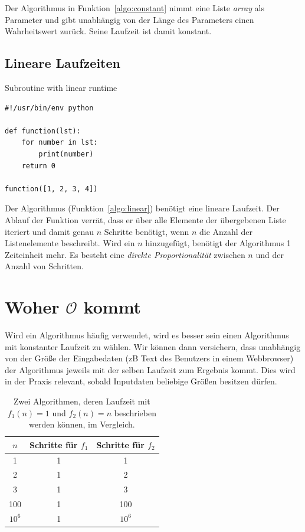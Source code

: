 Der Algorithmus in Funktion~\ref{algo:constant} nimmt eine Liste \textit{array} als Parameter und gibt unabhängig von der Länge des Parameters einen Wahrheitswert zurück. Seine Laufzeit ist damit konstant.

\subsection{Lineare Laufzeiten}
%
\begin{algorithm}[p]
\caption{Subroutine with linear runtime}
\label{algo:linear}
\begin{lstlisting}
#!/usr/bin/env python

def function(lst):
    for number in lst:
        print(number)
    return 0

function([1, 2, 3, 4])
\end{lstlisting}
\end{algorithm}

Der Algorithmus (Funktion~\ref{algo:linear}) benötigt eine lineare Laufzeit. Der Ablauf der Funktion verrät, dass er über alle Elemente der übergebenen Liste iteriert und damit genau $n$ Schritte benötigt, wenn $n$ die Anzahl der Listenelemente beschreibt. Wird ein $n$ hinzugefügt, benötigt der Algorithmus 1 Zeiteinheit mehr. Es besteht eine \emph{direkte Proportionalität} zwischen $n$ und der Anzahl von Schritten.

\section{Woher $\mathcal{O}$ kommt}
%
Wird ein Algorithmus häufig verwendet, wird es besser sein einen Algorithmus mit konstanter Laufzeit zu wählen. Wir können dann versichern, dass unabhängig von der Größe der Eingabedaten (zB Text des Benutzers in einem Webbrowser) der Algorithmus jeweils mit der selben Laufzeit zum Ergebnis kommt. Dies wird in der Praxis relevant, sobald Inputdaten beliebige Größen besitzen dürfen.
%
\begin{table}
 \begin{center}
  \begin{tabular}{ccc}
   $n$ & Schritte für $f_1$ & Schritte für $f_2$ \\
  \hline
   1  & 1                  & 1 \\
   2  & 1                  & 2 \\
   3  & 1                  & 3 \\
   100 & 1                 & 100 \\
   $10^6$ & 1              & $10^6$ \\
 \hline
  \end{tabular}
  \caption{Zwei Algorithmen, deren Laufzeit mit $f_1(n) = 1$ und $f_2(n) = n$ beschrieben werden können, im Vergleich.}
 \end{center}
\end{table}

